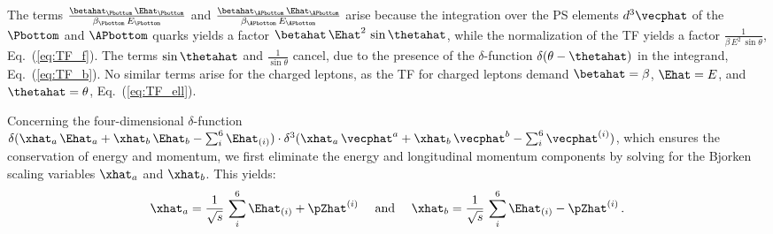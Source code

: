 The terms $\frac{\betahat_{\Pbottom} \, \Ehat_{\Pbottom}}{\beta_{\Pbottom} \, E_{\Pbottom}}$ and $\frac{\betahat_{\APbottom} \, \Ehat_{\APbottom}}{\beta_{\APbottom} \, E_{\APbottom}}$ 
arise because the integration over the PS elements $d^{3}\vecphat$ of the $\Pbottom$ and $\APbottom$ quarks yields a factor $\betahat \, \Ehat^{2} \, \sin\thetahat$,
while the normalization of the TF yields a factor $\frac{1}{\beta \, E^{2} \, \sin\theta}$, \cf Eq.~(\ref{eq:TF_f}).
The terms $\sin\thetahat$ and $\frac{1}{\sin\theta}$ cancel, due to the presence of the $\delta$-function $\delta(\theta - \thetahat)$ in the integrand, \cf Eq.~(\ref{eq:TF_b}).
No similar terms arise for the charged leptons, as the TF for charged leptons demand $\betahat = \beta$, $\Ehat = E$, and $\thetahat = \theta$, \cf Eq.~(\ref{eq:TF_ell}).

Concerning the four-dimensional $\delta$-function 
$\delta( \xhat_{a} \, \Ehat_{a} + \xhat_{b} \, \Ehat_{b} - \sum_{i}^{6} \Ehat_{(i)}) \cdot \delta^{3}( \xhat_{a} \, \vecphat^{a} + \xhat_{b} \, \vecphat^{b} - \sum_{i}^{6} \vecphat^{(i)})$,
which ensures the conservation of energy and momentum,
we first eliminate the energy and longitudinal momentum components by solving for the Bjorken scaling variables $\xhat_{a}$ and $\xhat_{b}$.
This yields:
\begin{equation}
\xhat_{a} = \frac{1}{\sqrt{s}} \, \sum_{i}^{6} \Ehat_{(i)} + \pZhat^{(i)} \quad \mbox{ and } \quad
\xhat_{b} = \frac{1}{\sqrt{s}} \, \sum_{i}^{6} \Ehat_{(i)} - \pZhat^{(i)} \, .
\label{eq:Bjorkenx}
\end{equation}

